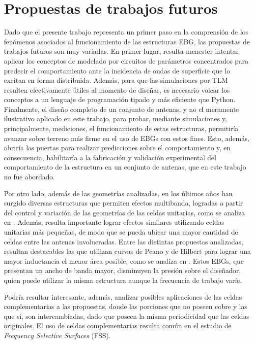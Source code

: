 \section{Propuestas de trabajos futuros}

Dado que el presente trabajo representa un primer paso en la comprensión de los fenómenos asociados al funcionamiento de las estructuras EBG, las propuestas de trabajos futuros son muy variadas. En primer lugar, resulta menester intentar aplicar los conceptos de modelado por circuitos de parámetros concentrados para predecir el comportamiento ante la incidencia de ondas de superficie que lo excitan en forma distribuida. Además, para que las simulaciones por TLM resulten efectivamente útiles al momento de diseñar, es necesario volcar los conceptos a un lenguaje de programación tipado y más eficiente que Python. Finalmente, el diseño completo de un conjunto de antenas, y no el meramente ilustrativo aplicado en este trabajo, para probar, mediante simulaciones y, principalmente, mediciones, el funcionamiento de estas estructuras, permitiría avanzar sobre terreno más firme en el uso de EBGs con estos fines. Esto, además, abriría las puertas para realizar predicciones sobre el comportamiento y, en consecuencia, habilitaría a la fabricación y validación experimental del comportamiento de la estructura en un conjunto de antenas, que en este trabajo no fue abordado.

Por otro lado, además de las geometrías analizadas, en los últimos años han surgido diversas estructuras que permiten efectos multibanda, logradas a partir del control y variación de las geometrías de las celdas unitarias, como se analiza en \cite{Kern:multiband}. Además, resulta importante lograr efectos similares utilizando celdas unitarias más pequeñas, de modo que se pueda ubicar una mayor cantidad de celdas entre las antenas involucradas. Entre las distintas propuestas analizadas, resultan destacables las que utilizan curvas de Peano y de Hilbert para lograr una mayor inductancia el menor área posible, como se analiza en \cite{McVay:Peano}. Estos EBGs, que presentan un ancho de banda mayor, disminuyen la presión sobre el diseñador, quien puede utilizar la misma estructura aunque la frecuencia de trabajo varíe.

Podría resultar interesante, además, analizar posibles aplicaciones de las celdas complementarias a las propuestas, donde las porciones que no poseen cobre y las que sí, son intercambiadas, dado que poseen la misma periodicidad que las celdas originales. El uso de celdas complementarias resulta común en el estudio de \textit{Frequency Selective Surfaces} (FSS).

